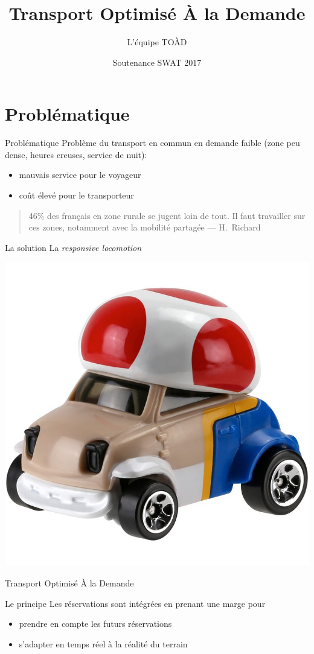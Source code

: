 \documentclass[table]{beamer}
\title{Transport Optimisé À la Demande}
\author{L'équipe TOÀD}
\institute[Kisio Digital] %
{
  Kisio Digital\\
  20 rue Hector Malot\\
  75012 Paris, France}
\date{Soutenance SWAT 2017}
\begin{document}
\begin{frame}
  \titlepage
\end{frame}

\section{Problématique}

\begin{frame}{Problématique}
  Problème du transport en commun en demande faible (zone peu dense,
  heures creuses, service de nuit):
  \begin{itemize}
  \item mauvais service pour le voyageur
  \item coût élevé pour le transporteur
  \end{itemize}

  \begin{quote}
    46\% des français en zone rurale se jugent loin de tout. Il faut
    travailler sur ces zones, notamment avec la mobilité partagée ---
    H.~Richard
  \end{quote}
\end{frame}

\begin{frame}{La solution}
  La \emph{responsive locomotion}

  \begin{center}
    \includegraphics[width=0.4\linewidth]{images/toad}

    Transport Optimisé À la Demande
  \end{center}
\end{frame}

\begin{frame}{Le principe}
  Les réservations sont intégrées en prenant une marge pour
  \begin{itemize}
  \item prendre en compte les futurs réservations
  \item s'adapter en temps réel à la réalité du terrain
  \end{itemize}
\end{frame}
\end{document}
